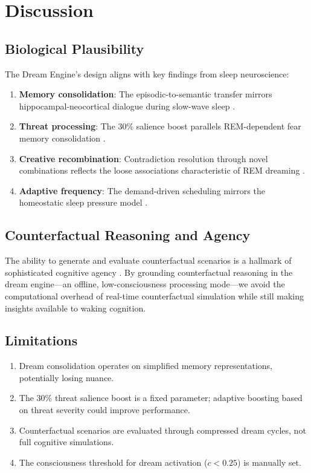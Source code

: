 \documentclass[11pt,a4paper]{article}
\begin{document}
\section{Discussion}

\subsection{Biological Plausibility}

The Dream Engine's design aligns with key findings from sleep neuroscience:

\begin{enumerate}[nosep]
    \item \textbf{Memory consolidation}: The episodic-to-semantic transfer mirrors hippocampal-neocortical dialogue during slow-wave sleep \citep{buzsaki2015}.
    \item \textbf{Threat processing}: The 30\% salience boost parallels REM-dependent fear memory consolidation \citep{pace-schott2015}.
    \item \textbf{Creative recombination}: Contradiction resolution through novel combinations reflects the loose associations characteristic of REM dreaming \citep{cai2009}.
    \item \textbf{Adaptive frequency}: The demand-driven scheduling mirrors the homeostatic sleep pressure model \citep{borbely1982}.
\end{enumerate}

\subsection{Counterfactual Reasoning and Agency}

The ability to generate and evaluate counterfactual scenarios is a hallmark of sophisticated cognitive agency \citep{pearl2009}. By grounding counterfactual reasoning in the dream engine---an offline, low-consciousness processing mode---we avoid the computational overhead of real-time counterfactual simulation while still making insights available to waking cognition.

\subsection{Limitations}

\begin{enumerate}[nosep]
    \item Dream consolidation operates on simplified memory representations, potentially losing nuance.
    \item The 30\% threat salience boost is a fixed parameter; adaptive boosting based on threat severity could improve performance.
    \item Counterfactual scenarios are evaluated through compressed dream cycles, not full cognitive simulations.
    \item The consciousness threshold for dream activation ($c < 0.25$) is manually set.
\end{enumerate}
\end{document}
